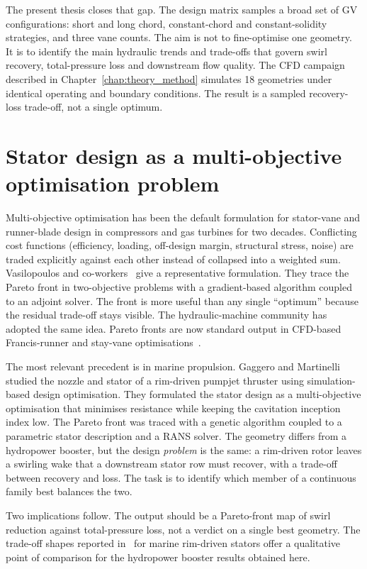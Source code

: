 The present thesis closes that gap. The design matrix samples a broad set of GV configurations: short and long chord, constant-chord and constant-solidity strategies, and three vane counts. The aim is not to fine-optimise one geometry. It is to identify the main hydraulic trends and trade-offs that govern swirl recovery, total-pressure loss and downstream flow quality. The CFD campaign described in Chapter~\ref{chap:theory_method} simulates 18 geometries under identical operating and boundary conditions. The result is a sampled recovery-loss trade-off, not a single optimum.
 
\section{Stator design as a multi-objective optimisation problem}
\label{sec:lit_pareto}
 
Multi-objective optimisation has been the default formulation for stator-vane and runner-blade design in compressors and gas turbines for two decades. Conflicting cost functions (efficiency, loading, off-design margin, structural stress, noise) are traded explicitly against each other instead of collapsed into a weighted sum. Vasilopoulos and co-workers~\cite{Vasilopoulos2019} give a representative formulation. They trace the Pareto front in two-objective problems with a gradient-based algorithm coupled to an adjoint solver. The front is more useful than any single ``optimum'' because the residual trade-off stays visible. The hydraulic-machine community has adopted the same idea. Pareto fronts are now standard output in CFD-based Francis-runner and stay-vane optimisations~\cite{Schnoes2018}.
 
The most relevant precedent is in marine propulsion. Gaggero and Martinelli~\cite{GaggeroMartinelli2024} studied the nozzle and stator of a rim-driven pumpjet thruster using simulation-based design optimisation. They formulated the stator design as a multi-objective optimisation that minimises resistance while keeping the cavitation inception index low. The Pareto front was traced with a genetic algorithm coupled to a parametric stator description and a RANS solver. The geometry differs from a hydropower booster, but the design \emph{problem} is the same: a rim-driven rotor leaves a swirling wake that a downstream stator row must recover, with a trade-off between recovery and loss. The task is to identify which member of a continuous family best balances the two.
 
Two implications follow. The output should be a Pareto-front map of swirl reduction against total-pressure loss, not a verdict on a single best geometry. The trade-off shapes reported in~\cite{GaggeroMartinelli2024} for marine rim-driven stators offer a qualitative point of comparison for the hydropower booster results obtained here.
 

